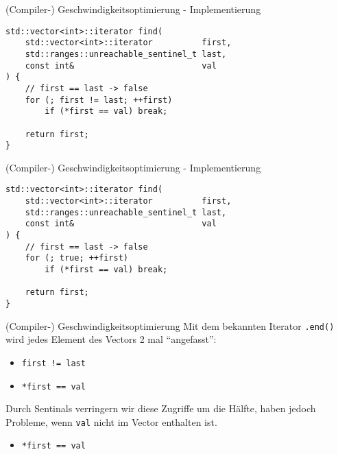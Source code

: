 \begin{frame}[fragile]{(Compiler-) Geschwindigkeitsoptimierung - Implementierung}
    \begin{verbatim}
std::vector<int>::iterator find(
    std::vector<int>::iterator          first,
    std::ranges::unreachable_sentinel_t last,
    const int&                          val
) {
    // first == last -> false
    for (; first != last; ++first)
        if (*first == val) break;
    
    return first;
}
    \end{verbatim}
\end{frame}

\begin{frame}[fragile]{(Compiler-) Geschwindigkeitsoptimierung - Implementierung}
    \begin{verbatim}
std::vector<int>::iterator find(
    std::vector<int>::iterator          first,
    std::ranges::unreachable_sentinel_t last,
    const int&                          val
) {
    // first == last -> false
    for (; true; ++first)
        if (*first == val) break;
    
    return first;
}
    \end{verbatim}
\end{frame}

\begin{frame}[fragile]{(Compiler-) Geschwindigkeitsoptimierung}
    Mit dem bekannten Iterator \texttt{.end()} wird jedes Element des Vectors 2 mal \enquote{angefasst}:
    \begin{itemize}
        \item \texttt{first != last}
        \item \texttt{*first == val}
    \end{itemize}

    \vspace{2.5em}

    Durch Sentinals verringern wir diese Zugriffe um die Hälfte, haben jedoch Probleme, wenn \texttt{val} nicht im Vector enthalten ist.
    \begin{itemize}
        \item \texttt{*first == val}
    \end{itemize}
\end{frame}